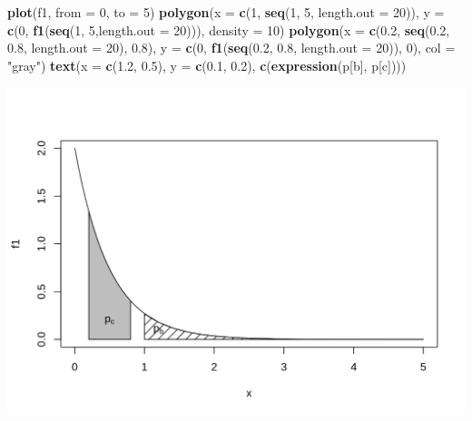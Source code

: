 \documentclass[10pt,a4paper]{book}
\newenvironment{Shaded}{\begin{snugshade}}{\end{snugshade}}
\newcommand{\KeywordTok}[1]{\textcolor[rgb]{0.13,0.29,0.53}{\textbf{#1}}}
\newcommand{\DataTypeTok}[1]{\textcolor[rgb]{0.13,0.29,0.53}{#1}}
\newcommand{\DecValTok}[1]{\textcolor[rgb]{0.00,0.00,0.81}{#1}}
\newcommand{\FloatTok}[1]{\textcolor[rgb]{0.00,0.00,0.81}{#1}}
\newcommand{\StringTok}[1]{\textcolor[rgb]{0.31,0.60,0.02}{#1}}
\newcommand{\NormalTok}[1]{#1}
\begin{document}
\begin{Shaded}
\begin{Highlighting}[]
\KeywordTok{plot}\NormalTok{(f1, }\DataTypeTok{from =} \DecValTok{0}\NormalTok{, }\DataTypeTok{to =} \DecValTok{5}\NormalTok{)}
\KeywordTok{polygon}\NormalTok{(}\DataTypeTok{x =} \KeywordTok{c}\NormalTok{(}\DecValTok{1}\NormalTok{, }\KeywordTok{seq}\NormalTok{(}\DecValTok{1}\NormalTok{, }\DecValTok{5}\NormalTok{, }\DataTypeTok{length.out =} \DecValTok{20}\NormalTok{)),}
        \DataTypeTok{y =} \KeywordTok{c}\NormalTok{(}\DecValTok{0}\NormalTok{, }\KeywordTok{f1}\NormalTok{(}\KeywordTok{seq}\NormalTok{(}\DecValTok{1}\NormalTok{, }\DecValTok{5}\NormalTok{,}\DataTypeTok{length.out =} \DecValTok{20}\NormalTok{))),}
        \DataTypeTok{density =} \DecValTok{10}\NormalTok{)}
\KeywordTok{polygon}\NormalTok{(}\DataTypeTok{x =} \KeywordTok{c}\NormalTok{(}\FloatTok{0.2}\NormalTok{, }\KeywordTok{seq}\NormalTok{(}\FloatTok{0.2}\NormalTok{, }\FloatTok{0.8}\NormalTok{, }\DataTypeTok{length.out =} \DecValTok{20}\NormalTok{), }\FloatTok{0.8}\NormalTok{),}
        \DataTypeTok{y =} \KeywordTok{c}\NormalTok{(}\DecValTok{0}\NormalTok{, }\KeywordTok{f1}\NormalTok{(}\KeywordTok{seq}\NormalTok{(}\FloatTok{0.2}\NormalTok{, }\FloatTok{0.8}\NormalTok{, }\DataTypeTok{length.out =} \DecValTok{20}\NormalTok{)), }\DecValTok{0}\NormalTok{),}
        \DataTypeTok{col =} \StringTok{"gray"}\NormalTok{)}
\KeywordTok{text}\NormalTok{(}\DataTypeTok{x =} \KeywordTok{c}\NormalTok{(}\FloatTok{1.2}\NormalTok{, }\FloatTok{0.5}\NormalTok{), }\DataTypeTok{y =} \KeywordTok{c}\NormalTok{(}\FloatTok{0.1}\NormalTok{, }\FloatTok{0.2}\NormalTok{),}
     \KeywordTok{c}\NormalTok{(}\KeywordTok{expression}\NormalTok{(p[b], p[c])))}
\end{Highlighting}
\end{Shaded}

\begin{center}\includegraphics{figures/unnamed-chunk-329-1} \end{center}
\end{document}

